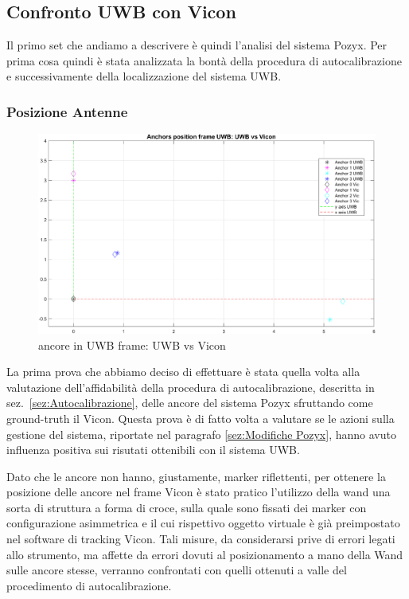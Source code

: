 \subsection{Confronto UWB con Vicon}
Il primo set che andiamo a descrivere \`e quindi l'analisi del sistema Pozyx. 
Per prima cosa quindi \`e stata analizzata la bont\`a della procedura di autocalibrazione e successivamente della localizzazione del sistema UWB.

\subsubsection{Posizione Antenne}
\label{confronto UWB vicon: posizione antenne}
\begin{figure}[]
	\centering
	\includegraphics[height=0.4\textheight]{anchors_UWB_Vicon.png}
	\caption{ancore in UWB frame: UWB vs Vicon}
	\label{fig: ancore in UWB frame, UWB vs Vicon}
\end{figure}

La prima prova che abbiamo deciso di effettuare è stata quella volta alla valutazione dell'affidabilità della procedura di autocalibrazione, descritta in sez.~\ref{sez:Autocalibrazione}, delle ancore del sistema Pozyx sfruttando come ground-truth il Vicon.
Questa prova è di fatto volta a valutare se le azioni sulla gestione del sistema, riportate nel paragrafo \ref{sez:Modifiche Pozyx}, hanno avuto influenza positiva sui risutati ottenibili con il sistema UWB.

Dato che le ancore non hanno, giustamente, marker riflettenti, per ottenere la posizione delle ancore nel frame Vicon \`e stato pratico l'utilizzo della wand una sorta di struttura a forma di croce, sulla quale sono fissati dei marker con configurazione asimmetrica e il cui rispettivo oggetto virtuale è già preimpostato nel software di tracking Vicon.
Tali misure, da considerarsi prive di errori legati allo strumento, ma affette da errori dovuti al posizionamento a mano della Wand sulle ancore stesse, verranno confrontati con quelli ottenuti a valle del procedimento di autocalibrazione.

